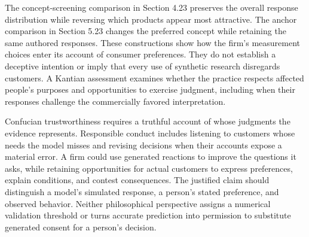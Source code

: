The concept-screening comparison in Section 4.23 preserves the overall
response distribution while reversing which products appear most
attractive. The anchor comparison in Section 5.23 changes the preferred
concept while retaining the same authored responses. These constructions
show how the firm's measurement choices enter its account of consumer
preferences. They do not establish a deceptive intention or imply that
every use of synthetic research disregards customers. A Kantian
assessment examines whether the practice respects affected people's
purposes and opportunities to exercise judgment, including when their
responses challenge the commercially favored interpretation.

Confucian trustworthiness requires a truthful account of whose judgments
the evidence represents. Responsible conduct includes listening to
customers whose needs the model misses and revising decisions when their
accounts expose a material error. A firm could use generated reactions
to improve the questions it asks, while retaining opportunities for
actual customers to express preferences, explain conditions, and contest
consequences. The justified claim should distinguish a model's simulated
response, a person's stated preference, and observed behavior. Neither
philosophical perspective assigns a numerical validation threshold or
turns accurate prediction into permission to substitute generated
consent for a person's decision.


